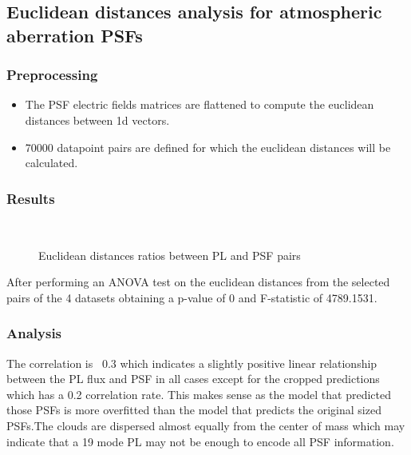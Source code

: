 \subsection{Euclidean distances analysis for atmospheric aberration PSFs}

	\subsubsection{Preprocessing}
		
		\begin{itemize}
			\item The PSF electric fields matrices are flattened to compute the euclidean distances between 1d vectors.
			\item 70000 datapoint pairs are defined for which the euclidean distances will be calculated.
		\end{itemize}
		
	\subsubsection{Results}
	
		\begin{figure*}[ht!]
			\centering
			\\
			\caption{Euclidean distances ratios between PL and PSF pairs}\hspace{\fill}
		\end{figure*}
		
		After performing an ANOVA test on the euclidean distances from the selected pairs of the 4 datasets obtaining a p-value of 0 and F-statistic of 4789.1531.
		
	\subsubsection{Analysis}
		The correlation is ~0.3 which indicates a slightly positive linear relationship between the PL flux and PSF in all cases except for the cropped predictions which has a 0.2 correlation rate. This makes sense as the model that predicted those PSFs is more overfitted than the model that predicts the original sized PSFs.The clouds are dispersed almost equally from the center of mass which may indicate that a 19 mode PL may not be enough to encode all PSF information. 
